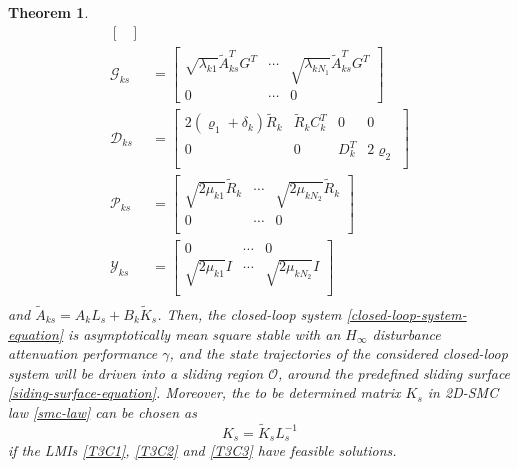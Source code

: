 \documentclass[conference]{IEEEtran}
\newtheorem{theorem}{Theorem}
\begin{document}
\begin{theorem}
\begin{equation}
\begin{split}
\begin{bmatrix}
			\end{bmatrix} \\
			\mathscr{G}_{ks} &=\begin{bmatrix}
				\sqrt{\lambda_{k1}} \tilde{A}^{T}_{ks}G^{T}& \cdots&\sqrt{\lambda_{kN_{1}}} \tilde{A}^{T}_{ks}G^{T}\\
				0  &\cdots& 0
			\end{bmatrix}\\
			\mathscr{D}_{ks} &= \begin{bmatrix}
				2(\varrho_{1}+ \delta_{k} )\tilde{R}_{k}& \tilde{R}_{k}C^{T}_{k}&0&0\\
				0&0&D^{T}_{k}&2\varrho_{2} \\
			\end{bmatrix} \\	
			\mathscr{P}_{ks} &= \begin{bmatrix}
				\sqrt{2\mu_{k1}} \tilde{R}_{k} &\cdots &\sqrt{2\mu_{kN_{2}}} \tilde{R}_{k}\\
				0 & \cdots & 0\\
			\end{bmatrix}	\\
			\mathscr{Y}_{ks} &= \begin{bmatrix}
				0 & \cdots & 0\\
				\sqrt{2\mu_{k1}} I &\cdots &\sqrt{2\mu_{kN_{2}}} I\\
			\end{bmatrix}	\\						
		\end{split}
	\end{equation}
	and $\tilde{A}_{ks} =  A_{k}L_{s} + B_{k}\tilde{K}_{s}$. Then,  the closed-loop system \eqref{closed-loop-system-equation} is asymptotically mean square stable with an $H_{\infty}$ disturbance attenuation performance $\gamma$, and the state trajectories of the considered closed-loop system will be driven into a sliding region $\mathcal{O}$, around the predefined sliding surface \eqref{siding-surface-equation}. Moreover, the to be determined matrix $K_{s}$ in 2D-SMC law \eqref{smc-law} can be chosen as 
	\begin{equation}
		K_{s} = \tilde{K}_{s}L^{-1}_{s}
	\end{equation}
	if the LMIs \eqref{T3C1}, \eqref{T3C2} and \eqref{T3C3} have feasible solutions.
\end{theorem}
\end{document}
